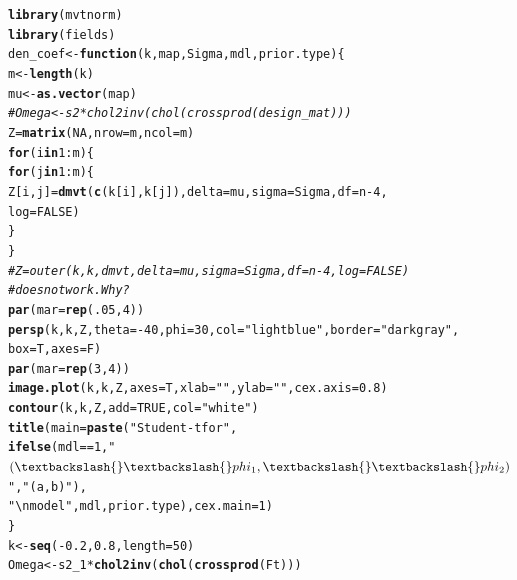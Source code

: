 \documentclass[12pt]{article}\usepackage[]{graphicx}\usepackage[]{color}
\makeatletter
\newcommand{\hlnum}[1]{\textcolor[rgb]{0.686,0.059,0.569}{#1}}%
\newcommand{\hlstr}[1]{\textcolor[rgb]{0.192,0.494,0.8}{#1}}%
\newcommand{\hlcom}[1]{\textcolor[rgb]{0.678,0.584,0.686}{\textit{#1}}}%
\newcommand{\hlopt}[1]{\textcolor[rgb]{0,0,0}{#1}}%
\newcommand{\hlstd}[1]{\textcolor[rgb]{0.345,0.345,0.345}{#1}}%
\newcommand{\hlkwa}[1]{\textcolor[rgb]{0.161,0.373,0.58}{\textbf{#1}}}%
\newcommand{\hlkwb}[1]{\textcolor[rgb]{0.69,0.353,0.396}{#1}}%
\newcommand{\hlkwc}[1]{\textcolor[rgb]{0.333,0.667,0.333}{#1}}%
\newcommand{\hlkwd}[1]{\textcolor[rgb]{0.737,0.353,0.396}{\textbf{#1}}}%
\newenvironment{kframe}{%
 \def\at@end@of@kframe{}%
 \ifinner\ifhmode%
  \def\at@end@of@kframe{\end{minipage}}%
  \begin{minipage}{\columnwidth}%
 \fi\fi%
 \def\FrameCommand##1{\hskip\@totalleftmargin \hskip-\fboxsep
 \colorbox{shadecolor}{##1}\hskip-\fboxsep
     \hskip-\linewidth \hskip-\@totalleftmargin \hskip\columnwidth}%
 \MakeFramed {\advance\hsize-\width
   \@totalleftmargin\z@ \linewidth\hsize
   \@setminipage}}%
 {\par\unskip\endMakeFramed%
 \at@end@of@kframe}
\newenvironment{knitrout}{}{} %
\makeatother
\begin{document}
\begin{knitrout}
\begin{kframe}
\begin{alltt}
\hlkwd{library}\hlstd{(mvtnorm)}
\hlkwd{library}\hlstd{(fields)}
\hlstd{den_coef} \hlkwb{<-} \hlkwa{function}\hlstd{(}\hlkwc{k}\hlstd{,} \hlkwc{map}\hlstd{,} \hlkwc{Sigma}\hlstd{,} \hlkwc{mdl}\hlstd{,} \hlkwc{prior.type}\hlstd{) \{}
    \hlstd{m} \hlkwb{<-} \hlkwd{length}\hlstd{(k)}
    \hlstd{mu} \hlkwb{<-} \hlkwd{as.vector}\hlstd{(map)}
    \hlcom{# Omega <- s2 * chol2inv(chol(crossprod(design_mat)))}
    \hlstd{Z} \hlkwb{=} \hlkwd{matrix}\hlstd{(}\hlnum{NA}\hlstd{,} \hlkwc{nrow} \hlstd{= m,} \hlkwc{ncol} \hlstd{= m)}
    \hlkwa{for} \hlstd{(i} \hlkwa{in} \hlnum{1}\hlopt{:}\hlstd{m) \{}
        \hlkwa{for} \hlstd{(j} \hlkwa{in} \hlnum{1}\hlopt{:}\hlstd{m) \{}
            \hlstd{Z[i, j]} \hlkwb{=} \hlkwd{dmvt}\hlstd{(}\hlkwd{c}\hlstd{(k[i], k[j]),} \hlkwc{delta} \hlstd{= mu,} \hlkwc{sigma} \hlstd{= Sigma,} \hlkwc{df} \hlstd{= n} \hlopt{-} \hlnum{4}\hlstd{,}
                           \hlkwc{log} \hlstd{=} \hlnum{FALSE}\hlstd{)}
        \hlstd{\}}
    \hlstd{\}}
    \hlcom{# Z = outer(k, k, dmvt, delta = mu, sigma = Sigma, df = n - 4, log = FALSE) }
    \hlcom{# does not work. Why?}
    \hlkwd{par}\hlstd{(}\hlkwc{mar} \hlstd{=} \hlkwd{rep}\hlstd{(}\hlnum{.05}\hlstd{,} \hlnum{4}\hlstd{))}
    \hlkwd{persp}\hlstd{(k, k, Z,} \hlkwc{theta} \hlstd{=} \hlopt{-}\hlnum{40}\hlstd{,} \hlkwc{phi} \hlstd{=} \hlnum{30}\hlstd{,} \hlkwc{col} \hlstd{=} \hlstr{"lightblue"}\hlstd{,} \hlkwc{border} \hlstd{=} \hlstr{"darkgray"}\hlstd{,}
          \hlkwc{box} \hlstd{= T,} \hlkwc{axes} \hlstd{= F)}
    \hlkwd{par}\hlstd{(}\hlkwc{mar} \hlstd{=} \hlkwd{rep}\hlstd{(}\hlnum{3}\hlstd{,} \hlnum{4}\hlstd{))}
    \hlkwd{image.plot}\hlstd{(k, k, Z,} \hlkwc{axes} \hlstd{= T,} \hlkwc{xlab} \hlstd{=} \hlstr{""}\hlstd{,} \hlkwc{ylab} \hlstd{=} \hlstr{""}\hlstd{,} \hlkwc{cex.axis} \hlstd{=} \hlnum{0.8}\hlstd{)}
    \hlkwd{contour}\hlstd{(k, k, Z,} \hlkwc{add} \hlstd{=} \hlnum{TRUE}\hlstd{,} \hlkwc{col} \hlstd{=} \hlstr{"white"}\hlstd{)}
    \hlkwd{title}\hlstd{(}\hlkwc{main} \hlstd{=} \hlkwd{paste}\hlstd{(}\hlstr{"Student-t for"}\hlstd{,}
                       \hlkwd{ifelse}\hlstd{(mdl} \hlopt{==} \hlnum{1}\hlstd{,} \hlstr{"$(\textbackslash{}\textbackslash{}phi_1, \textbackslash{}\textbackslash{}phi_2)$"}\hlstd{,} \hlstr{"(a, b)"}\hlstd{),}
                       \hlstr{"\textbackslash{}n model"}\hlstd{, mdl, prior.type),} \hlkwc{cex.main} \hlstd{=} \hlnum{1}\hlstd{)}
\hlstd{\}}
\hlstd{k} \hlkwb{<-} \hlkwd{seq}\hlstd{(}\hlopt{-}\hlnum{0.2}\hlstd{,} \hlnum{0.8}\hlstd{,} \hlkwc{length} \hlstd{=} \hlnum{50}\hlstd{)}
\hlstd{Omega} \hlkwb{<-} \hlstd{s2_1} \hlopt{*} \hlkwd{chol2inv}\hlstd{(}\hlkwd{chol}\hlstd{(}\hlkwd{crossprod}\hlstd{(Ft)))}

\end{alltt}
\end{kframe}
\end{knitrout}
\end{document}
